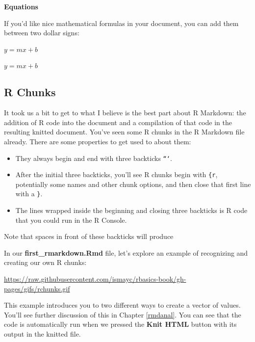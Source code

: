 \documentclass[]{tufte-book}
\newenvironment{Shaded}{\begin{snugshade}}{\end{snugshade}}
\newcommand{\NormalTok}[1]{{#1}}
\providecommand{\tightlist}{%
  \setlength{\itemsep}{0pt}\setlength{\parskip}{0pt}}
\begin{document}
\noindent\textbf{Equations}\vspace*{0.1in}

If you'd like nice mathematical formulas in your document, you can add
them between two dollar signs:

\begin{Shaded}
\begin{Highlighting}[]
\NormalTok{$y = mx + b$}
\end{Highlighting}
\end{Shaded}

\(y = mx + b\)

\subsection{R Chunks}\label{r-chunks}

It took us a bit to get to what I believe is the best part about R
Markdown: the addition of R code into the document and a compilation of
that code in the resulting knitted document. You've seen some R chunks
in the R Markdown file already. There are some properties to get used to
about them:

\begin{itemize}
\tightlist
\item
  They always begin and end with three backticks \texttt{```}.
\item
  After the initial three backticks, you'll see R chunks begin with
  \texttt{\{r}, potentially some names and other chunk options, and then
  close that first line with a \texttt{\}}.
\item
  The lines wrapped inside the beginning and closing three backticks is
  R code that you could run in the R Console.
\end{itemize}

Note that spaces in front of these backticks will produce

In our \textbf{first\_rmarkdown.Rmd} file, let's explore an example of
recognizing and creating our own R chunks:

\vspace{0.1in}

\begin{center}\footnotesize{\url{https://raw.githubusercontent.com/ismayc/rbasics-book/gh-pages/gifs/rchunks.gif}}\end{center}

\vspace{0.1in}

This example introduces you to two different ways to create a vector of
values. You'll see further discussion of this in Chapter \ref{rmdanal}.
You can see that the code is automatically run when we pressed the
\textbf{Knit HTML} button with its output in the knitted file.
\end{document}
